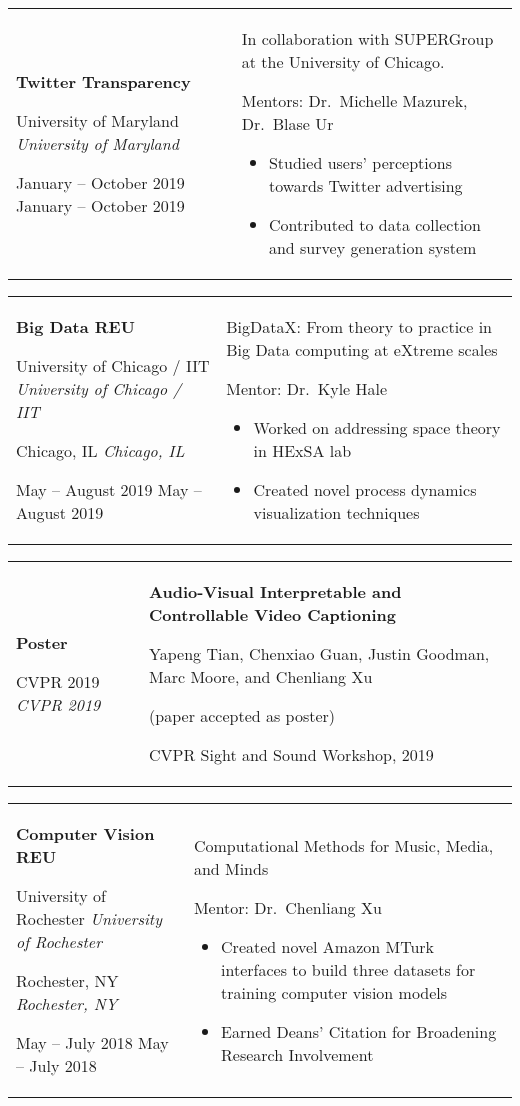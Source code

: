 \documentclass[11pt,letterpaper]{article}
\newcommand{\entry}[5]{
	\noindent
	\begin{tabular}{p{2in} p{\dimexpr \linewidth-2\tabcolsep-2.25in}} %
		\noindent \textbf{#1}
		
		\ifx #2  \else \noindent \textit{#2} \fi
		
		\ifx #3  \else \noindent \textit{#3} \fi
		
		\ifx #4  \else \noindent #4 \fi
		&
		#5
	\end{tabular}
	\vspace{0.5cm}
}
\begin{document}
	\entry{Twitter Transparency}{University of Maryland}{}{January -- October 2019}{
		In collaboration with SUPERGroup at the University of Chicago.
		
		Mentors: Dr.\ Michelle Mazurek, Dr.\ Blase Ur
		
		\begin{itemize}[itemsep=0pt, nosep, wide]
			\item Studied users' perceptions towards Twitter advertising
			\item Contributed to data collection and survey generation system
		\end{itemize}
	}
	
	
	\entry{Big Data REU}{University of Chicago / IIT}{Chicago, IL}{May -- August 2019}{
		BigDataX: From theory to practice in Big Data computing at eXtreme scales
		
		Mentor: Dr.\ Kyle Hale

		\begin{itemize}[itemsep=0pt, nosep, wide]
			\item Worked on addressing space theory in HExSA lab
			\item Created novel process dynamics visualization techniques
		\end{itemize}
	}
	
	
	\entry{Poster}{CVPR 2019}{}{}{
		\textbf{Audio-Visual Interpretable and Controllable Video Captioning}
		
		Yapeng Tian, Chenxiao Guan, Justin Goodman, Marc Moore, and Chenliang Xu
		
		(paper accepted as poster)
		
		CVPR Sight and Sound Workshop, 2019
	}
	
	\entry{Computer Vision REU}{University of Rochester}{Rochester, NY}{May -- July 2018}{
		Computational Methods for Music, Media, and Minds
		
		Mentor: Dr.\ Chenliang Xu
		
		\begin{itemize}[nosep, wide]
			\item Created novel Amazon MTurk interfaces to build three datasets for training computer vision models
			\item Earned Deans' Citation for Broadening Research Involvement
		\end{itemize}
	}
	
\end{document}
